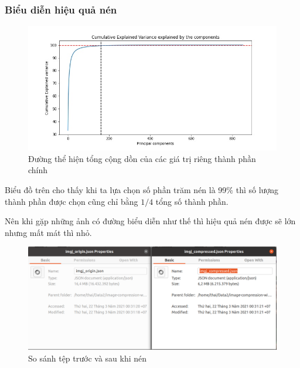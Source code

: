 \newpage
\subsubsection{Biểu diễn hiệu quả nén}

\begin{center}
    \begin{figure}[htp]
        \begin{center}
            \includegraphics[scale=.5]{Chapters/07_DimemsionalityReduction/27_pca/cumsum.jpg}
        \end{center}
        \caption{Đường thể hiện tổng cộng dồn của các giá trị riêng thành phần chính}
        \label{fig:27_9}
    \end{figure}
\end{center}

Biểu đồ trên cho thấy khi ta lựa chọn số phần trăm nén là 99$\%$ thì số lượng thành phần được chọn cũng chỉ bằng $1/4$ tổng số thành phần.


Nên khi gặp những ảnh có đường biểu diễn như thế thì hiệu quả nén được sẽ lớn nhưng mất mát thì nhỏ.

\begin{center}
    \begin{figure}[htp]
        \begin{center}
            \includegraphics[width=\textwidth,height=\textheight,keepaspectratio]{Chapters/07_DimemsionalityReduction/27_pca/compare.png}
        \end{center}
        \caption{So sánh tệp trước và sau khi nén}
        \label{fig:27_10}
    \end{figure}
\end{center}

